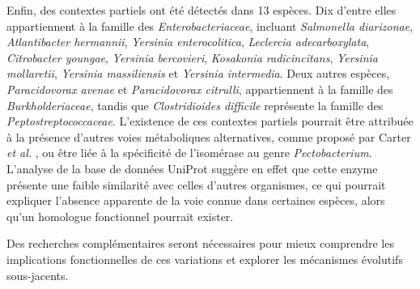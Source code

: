 \newpage

Enfin, des contextes partiels ont été détectés dans 13 espèces. Dix d’entre elles appartiennent à la famille des \textit{Enterobacteriaceae}, incluant \textit{Salmonella diarizonae}, \textit{Atlantibacter hermannii}, \textit{Yersinia enterocolitica}, \textit{Leclercia adecarboxylata}, \textit{Citrobacter youngae}, \textit{Yersinia bercovieri}, \textit{Kosakonia radicincitans}, \textit{Yersinia mollaretii}, \textit{Yersinia massiliensis} et \textit{Yersinia intermedia}. Deux autres espèces, \textit{Paracidovorax avenae} et \textit{Paracidovorax citrulli}, appartiennent à la famille des \textit{Burkholderiaceae}, tandis que \textit{Clostridioides difficile} représente la famille des \textit{Peptostreptococcaceae}. L’existence de ces contextes partiels pourrait être attribuée à la présence d’autres voies métaboliques alternatives, comme proposé par Carter \textit{et al.} \cite{carter_functional_2018}, ou être liée à la spécificité de l’isomérase au genre \textit{Pectobacterium}. L’analyse de la base de données UniProt \cite{the_uniprot_consortium_uniprot_2025} suggère en effet que cette enzyme présente une faible similarité avec celles d’autres organismes, ce qui pourrait expliquer l’absence apparente de la voie connue dans certaines espèces, alors qu’un homologue fonctionnel pourrait exister.

Des recherches complémentaires seront nécessaires pour mieux comprendre les implications fonctionnelles de ces variations et explorer les mécanismes évolutifs sous-jacents.

